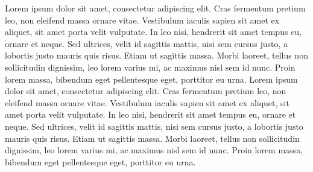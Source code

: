 Lorem ipsum dolor sit amet, consectetur adipiscing elit. Cras fermentum pretium leo, non eleifend massa ornare vitae. Vestibulum iaculis sapien sit amet ex aliquet, sit amet porta velit vulputate. In leo nisi, hendrerit sit amet tempus eu, ornare et neque. Sed ultrices, velit id sagittis mattis, nisi sem cursus justo, a lobortis justo mauris quis risus. Etiam ut sagittis massa. Morbi laoreet, tellus non sollicitudin dignissim, leo lorem varius mi, ac maximus nisl sem id nunc. Proin lorem massa, bibendum eget pellentesque eget, porttitor eu urna. Lorem ipsum dolor sit amet, consectetur adipiscing elit. Cras fermentum pretium leo, non eleifend massa ornare vitae. Vestibulum iaculis sapien sit amet ex aliquet, sit amet porta velit vulputate. In leo nisi, hendrerit sit amet tempus eu, ornare et neque. Sed ultrices, velit id sagittis mattis, nisi sem cursus justo, a lobortis justo mauris quis risus. Etiam ut sagittis massa. Morbi laoreet, tellus non sollicitudin dignissim, leo lorem varius mi, ac maximus nisl sem id nunc. Proin lorem massa, bibendum eget pellentesque eget, porttitor eu urna.
